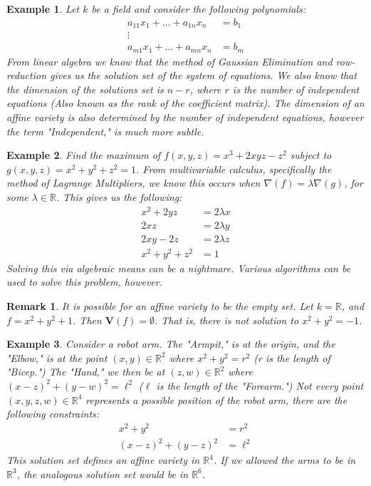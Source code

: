 \documentclass{article}
\theoremstyle{mystyle}
\newtheorem{example}{Example}[section]
\newtheorem{remark}{Remark}[section]
\begin{document}
\begin{example}
Let $k$ be a field and consider the following polynomials:
\begin{align*}
\nonumber a_{11}x_1+\hdots + a_{1n}x_n &= b_1 \\ \nonumber \vdots&  \\ \nonumber a_{m1}x_1+\hdots + a_{mn}x_n &= b_m
\end{align*}
From linear algebra we know that the method of Gaussian Elimination and row-reduction gives us the solution set of the system of equations. We also know that the dimension of the solutions set is $n-r$, where $r$ is the number of independent equations (Also known as the rank of the coefficient matrix). The dimension of an affine variety is also determined by the number of independent equations, however the term "Independent," is much more subtle.
\end{example}
\begin{example}
Find the maximum of $f(x,y,z) = x^3+2xyz-z^2$ subject to $g(x,y,z) = x^2+y^2+z^2=1$. From multivariable calculus, specifically the method of Lagrange Multipliers, we know this occurs when $\nabla(f) = \lambda \nabla(g)$, for some $\lambda \in \mathbb{R}$. This gives us the following:
\begin{align*}
    x^2+2yz &= 2\lambda x\\
    2xz &= 2\lambda y \\
    2xy-2z &= 2\lambda z\\
    x^2+y^2+z^2 &= 1
\end{align*}
Solving this via algebraic means can be a nightmare. Various algorithms can be used to solve this problem, however.
\end{example}
\begin{remark}
It is possible for an affine variety to be the empty set. Let $k = \mathbb{R}$, and $f = x^2+y^2+1$. Then $\mathbf{V}(f) = \emptyset$. That is, there is not solution to $x^2+y^2 = -1$.
\end{remark}
\begin{example}
Consider a robot arm. The "Armpit," is at the origin, and the "Elbow," is at the point $(x,y)\in \mathbb{R}^2$ where $x^2+y^2 = r^2$ (r is the length of "Bicep.") The "Hand," we then be at $(z,w)\in \mathbb{R}^2$ where $(x-z)^2 + (y-w)^2 = \ell^2$ ($\ell$ is the length of the "Forearm.") Not every point $(x,y,z,w)\in \mathbb{R}^4$ represents a possible position of the robot arm, there are the following constraints:
\begin{align*}
    x^2+y^2 &= r^2 \\ 
    (x-z)^2+(y-z)^2 &= \ell^2
\end{align*}
This solution set defines an affine variety in $\mathbb{R}^4$. If we allowed the arms to be in $\mathbb{R}^3$, the analogous solution set would be in $\mathbb{R}^6$.
\end{example}
\end{document}
